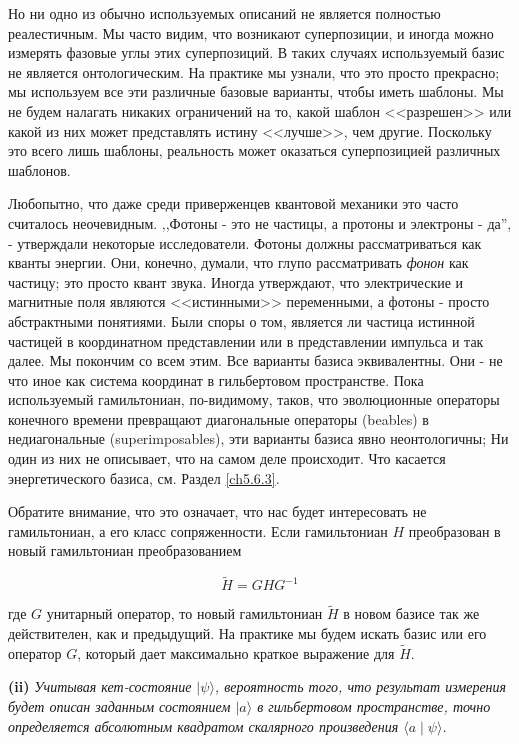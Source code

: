 \documentclass[main.tex]{subfiles}
\begin{document}
Но ни одно из обычно используемых описаний не является полностью реалестичным. Мы часто видим, что возникают суперпозиции, и иногда можно измерять фазовые углы этих суперпозиций. В таких случаях используемый базис не является онтологическим. На практике мы узнали, что это просто прекрасно; мы используем все эти различные базовые варианты, чтобы иметь шаблоны. Мы не будем налагать никаких ограничений на то, какой шаблон <<разрешен>> или какой из них может представлять истину <<лучше>>, чем другие. Поскольку это всего лишь шаблоны, реальность может оказаться суперпозицией различных шаблонов.

Любопытно, что даже среди приверженцев квантовой механики это часто считалось неочевидным. ,,Фотоны - это не частицы, а протоны и электроны - да'', - утверждали некоторые исследователи. Фотоны должны рассматриваться как кванты энергии. Они, конечно, думали, что глупо рассматривать \textit{фонон} как частицу; это просто квант звука. Иногда утверждают, что электрические и магнитные поля являются <<истинными>> переменными, а фотоны - просто абстрактными понятиями. Были споры о том, является ли частица истинной частицей в координатном представлении или в представлении импульса и так далее. Мы покончим со всем этим. Все варианты базиса эквивалентны. Они - не что иное как система координат в гильбертовом пространстве. Пока используемый гамильтониан, по-видимому, таков, что эволюционные операторы конечного времени превращают диагональные операторы (beables) в недиагональные (superimposables), эти варианты базиса явно неонтологичны; Ни один из них не описывает, что на самом деле происходит. Что касается энергетического базиса, см. Раздел \ref{ch5.6.3}.

Обратите внимание, что это означает, что нас будет интересовать не гамильтониан, а его класс сопряженности. Если гамильтониан $H$ преобразован в новый гамильтониан преобразованием

\begin{equation}\label{5.7}
	\tilde H = GHG^{-1}
\end{equation}

           
где $G$ унитарный оператор, то новый гамильтониан $\tilde H$ в новом базисе так же действителен, как и предыдущий. На практике мы будем искать базис или его оператор $G$, который дает максимально краткое выражение для $\tilde H$.

\textbf{(ii)} {\it Учитывая кет-состояние $|\psi\rangle$, вероятность того, что результат измерения будет описан заданным состоянием $|a\rangle$ в гильбертовом пространстве, точно определяется абсолютным квадратом скалярного произведения $\langle a\mid \psi\rangle$.}
\end{document}
